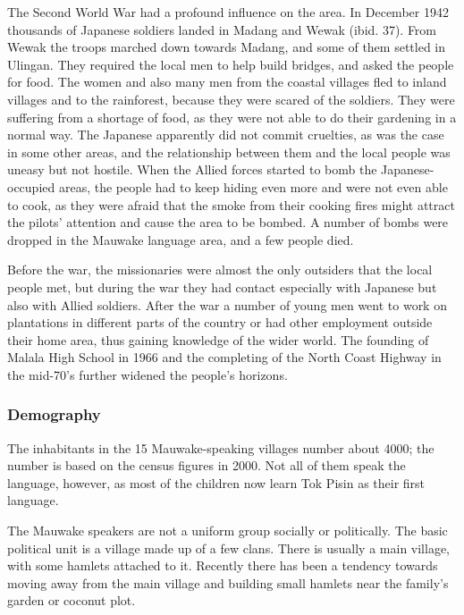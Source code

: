 The Second World War had a profound influence on the area.  In December 1942 thousands of Japanese soldiers landed in Madang and Wewak (ibid. 37).  From Wewak the troops marched down towards Madang, and some of them settled in Ulingan.  They required the local men to help build bridges, and asked the people for food.  The women and also many men from the coastal villages fled to inland villages and to the rainforest, because they were scared of the soldiers.  They were suffering from a shortage of food, as they were not able to do their gardening in a normal way.  The Japanese apparently did not commit cruelties, as was the case in some other areas, and the relationship between them and the local people was uneasy but not hostile. When the Allied forces started to bomb the Japanese-occupied areas, the people had to keep hiding even more and were not even able to cook, as they were afraid that the smoke from their cooking fires might attract the pilots' attention and cause the area to be bombed.  A number of bombs were dropped in the Mauwake language area, and a few people died. 

Before the war, the missionaries were almost the only outsiders that the local people met, but during the war they had contact especially with Japanese but also with Allied soldiers.  After the war a number of young men went to work on plantations in different parts of the country or had other employment outside their home area, thus gaining knowledge of the wider world. The founding of Malala High School in 1966 and the completing of the North Coast Highway in the mid-70's further widened the people's horizons.

\subsubsection{Demography}\footnotemark{}
\hypertarget{RefHeading18481935131865}{}
The inhabitants in the 15 Mauwake-speaking villages number about 4000;  the number is based on the census figures in 2000.  Not all of them speak the language, however, as most of the children now learn Tok Pisin as their first language.

The Mauwake speakers are not a uniform group socially or politically. The basic political unit is a village made up of a few clans. There is usually a main village, with some hamlets attached to it.  Recently there has been a tendency towards moving away from the main village and building small hamlets near the family's garden or coconut plot. 

